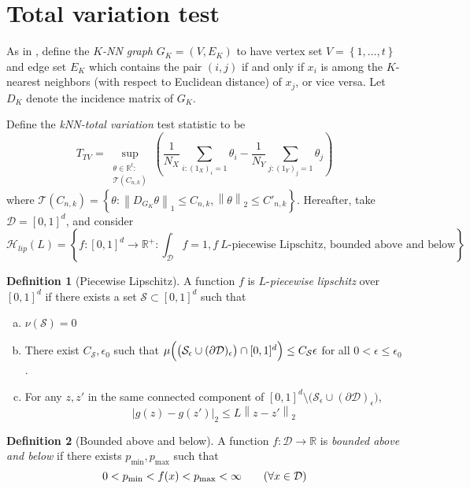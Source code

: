 \documentclass{article}
\newcommand{\Reals}{\mathbb{R}}
\newcommand{\norm}[1]{\left\lVert#1\right\rVert}
\newcommand{\abs}[1]{\left \lvert #1 \right \rvert}
\newcommand{\set}[1]{\left\{#1\right\}}
\newcommand{\1}{\mathbb{I}}
\newcommand{\D}{\mathcal{D}}
\newcommand{\Sset}{\mathcal{S}}
\newcommand{\Hclass}{\mathcal{H}}
\theoremstyle{alden}
\theoremstyle{aldenthm}
\theoremstyle{definition}
\newtheorem{definition}{Definition}[section]
\theoremstyle{remark}
\begin{document}
\section{Total variation test}

As in \citep{padilla2018}, define the \emph{$K$-NN graph} $G_K = (V,E_K)$ to have vertex set $V = \set{1, \ldots, t}$ and edge set $E_K$ which contains the pair $(i,j)$ if and only if $x_i$ is among the $K$-nearest neighbors (with respect to Euclidean distance) of $x_j$, or vice versa. Let $D_K$ denote the incidence matrix of $G_K$. 

Define the \emph{kNN-total variation} test statistic to be
\begin{equation}
\label{eqn: knn_tv_test_statistic}
T_{TV} = \sup_{\substack{\theta \in \Reals^{t}: \\ \mathcal{T}(C_{n,k})} } \left(\frac{1}{N_X}\sum_{i: (1_X)_i = 1} \theta_i - \frac{1}{N_Y}\sum_{j:(1_Y)_j = 1} \theta_j\right)
\end{equation}
where $\mathcal{T}(C_{n,k}) = \set{\theta: \norm{D_{G_K}\theta}_1 \leq C_{n,k},
\norm{\theta}_2 \leq C'_{n,k}}$. 
Hereafter, take $\D = [0,1]^d$, and consider
\begin{equation*}
\Hclass_{lip}(L) = \set{f: [0,1]^d \to \Reals^{+}: \int_{\D}f = 1, f~ \text{$L$-piecewise Lipschitz, bounded above and below} }
\end{equation*}

\begin{definition}[Piecewise Lipschitz]
	\label{def: piecewise_lipschitz}
	A function $f$ is $L$-\emph{piecewise lipschitz} over $[0,1]^d$ if there exists a set $\Sset \subset [0,1]^d$ such that
	\begin{enumerate}[(a)]
		\item $\nu(\Sset) = 0$
		\item There exist $C_{\Sset}, \epsilon_0$ such that $\mu \Bigl( \bigl(\Sset_{\epsilon} \cup (\partial \D)_{\epsilon} \bigr) \cap [0,1]^d \Bigr) \leq C_{\Sset} \epsilon$ for all $0 < \epsilon \leq \epsilon_0$.
		\item For any $z, z'$ in the same connected component of $[0,1]^d \setminus \bigl(\Sset_{\epsilon} \cup (\partial \D)_{\epsilon}\bigr)$,
		\begin{equation*}
		\abs{g(z) - g(z')}_2 \leq L\norm{z - z'}_2
		\end{equation*}
	\end{enumerate}
\end{definition}

\begin{definition}[Bounded above and below]
	\label{def: bounded}
	A function $f: \D \to \Reals$ is \emph{bounded above and below} if there exists $p_{\min}, p_{\max}$ such that
	\begin{equation*}
	0 < p_{\min} < f(x) < p_{\max} < \infty \tag{$\forall x \in \D$}
	\end{equation*}
\end{definition}
\end{document}
